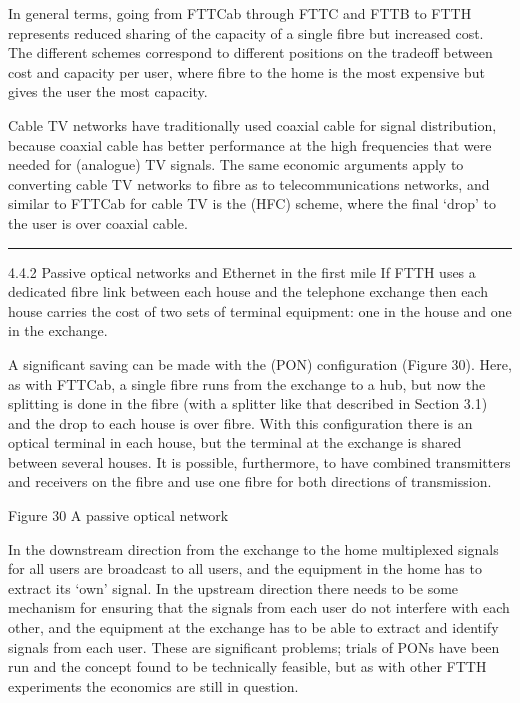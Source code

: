 \documentclass[letterpaper,10pt,english]{sphinxmanual}
\let\sphinxpxdimen\pdfpxdimen\else\newdimen\sphinxpxdimen
\begin{document}
In general terms, going from FTTCab through FTTC and FTTB to FTTH represents reduced sharing of the capacity of a single fibre but increased cost. The different schemes correspond to different positions on the trade\sphinxhyphen{}off between cost and capacity per user, where fibre to the home is the most expensive but gives the user the most capacity.

Cable TV networks have traditionally used coaxial cable for signal distribution, because coaxial cable has better performance at the high frequencies that were needed for (analogue) TV signals. The same economic arguments apply to converting cable TV networks to fibre as to telecommunications networks, and similar to FTTCab for cable TV is the  (HFC) scheme, where the final ‘drop’ to the user is over coaxial cable.


\bigskip\hrule\bigskip


4.4.2 Passive optical networks and Ethernet in the first mile If FTTH uses a dedicated fibre link between each house and the telephone exchange then each house carries the cost of two sets of terminal equipment: one in the house and one in the exchange.

A significant saving can be made with the  (PON) configuration (Figure 30). Here, as with FTTCab, a single fibre runs from the exchange to a hub, but now the splitting is done in the fibre (with a splitter like that described in Section 3.1) and the drop to each house is over fibre. With this configuration there is an optical terminal in each house, but the terminal at the exchange is shared between several houses. It is possible, furthermore, to have  \sphinxhyphen{}
combined transmitters and receivers \textendash{} on the fibre and use one fibre for both directions of transmission.

\sphinxincludegraphics[width=511\sphinxpxdimen,height=155\sphinxpxdimen]{{companionhighres_003i}.jpg}

Figure 30 A passive optical network

In the downstream direction \textendash{} from the exchange to the home \textendash{} multiplexed signals for all users are broadcast to all users, and the equipment in the home has to extract its ‘own’ signal. In the upstream direction there needs to be some mechanism for ensuring that the signals from each user do not interfere with each other, and the equipment at the exchange has to be able to extract and identify signals from each user. These are significant problems; trials of PONs have been run and the concept
found to be technically feasible, but as with other FTTH experiments the economics are still in question.
\end{document}
